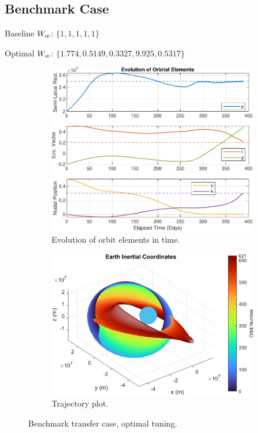 \subsection{Benchmark Case}
\label{sec:bench_case_plot}
Baseline \(W_{\moe}\): \(\{1, 1, 1, 1, 1\}\)


Optimal \(W_{\moe}\): \(\{1.774, 0.5149, 0.3327, 9.925, 0.5317\}\)

\begin{figure}[H]
  \centering
  \begin{subfigure}[t]{0.49\textwidth}
    \includegraphics[width=\textwidth]{figures/benchmark_optim/orbital_elements.pdf}
    \caption{Evolution of orbit elements in time.}
    \label{fig:results_benchmark_optim_a}
  \end{subfigure}
  \begin{subfigure}[t]{0.49\textwidth}
    \includegraphics[width=\textwidth]{figures/benchmark_optim/trajectory_plot.png}
    \caption{Trajectory plot.}
    \label{fig:results_benchmark_optim_b}
  \end{subfigure}
  \caption{Benchmark transfer case, optimal tuning.}
  \label{fig:results_benchmark_optim}
\end{figure}


